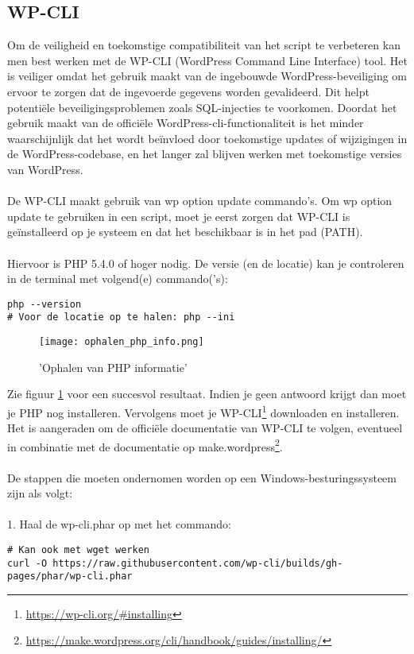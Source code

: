 \subsection{WP-CLI}
Om de veiligheid en toekomstige compatibiliteit van het script te verbeteren kan men best werken met de WP-CLI (WordPress Command Line Interface) tool. Het is veiliger omdat het gebruik maakt van de ingebouwde WordPress-beveiliging om ervoor te zorgen dat de ingevoerde gegevens worden gevalideerd. Dit helpt potentiële beveiligingsproblemen zoals SQL-injecties te voorkomen. Doordat het gebruik maakt van de officiële WordPress-cli-functionaliteit is het minder waarschijnlijk dat het wordt beïnvloed door toekomstige updates of wijzigingen in de WordPress-codebase, en het langer zal blijven werken met toekomstige versies van WordPress.
\\\\
De WP-CLI maakt gebruik van wp option update commando's. Om wp option update te gebruiken in een script, moet je eerst zorgen dat WP-CLI is geïnstalleerd op je systeem en dat het beschikbaar is in het pad (PATH).
\\\\
Hiervoor is PHP 5.4.0 of hoger nodig. De versie (en de locatie) kan je controleren in de terminal met volgend(e) commando('s):
\begin{verbatim}
php --version
# Voor de locatie op te halen: php --ini
\end{verbatim}
\begin{figure}
    \caption{'Ophalen van PHP informatie'}
    \label{ophalen_php_info}
    \centering
    \texttt{[image: ophalen\_php\_info.png]}
\end{figure}Zie figuur \ref{ophalen_php_info} voor een succesvol resultaat. Indien je geen antwoord krijgt dan moet je PHP nog installeren. Vervolgens moet je WP-CLI\footnote{\href{https://wp-cli.org/\#installing}{https://wp-cli.org/\#installing}} downloaden en installeren. Het is aangeraden om de officiële documentatie van WP-CLI te volgen, eventueel in combinatie met de documentatie op make.wordpress\footnote{\href{https://make.wordpress.org/cli/handbook/guides/installing/}{https://make.wordpress.org/cli/handbook/guides/installing/}}. 
\\\\
De stappen die moeten ondernomen worden op een Windows-besturingssysteem zijn als volgt:
\\\\
1. Haal de wp-cli.phar op met het commando:
\begin{verbatim}
# Kan ook met wget werken
curl -O https://raw.githubusercontent.com/wp-cli/builds/gh-pages/phar/wp-cli.phar
\end{verbatim}

